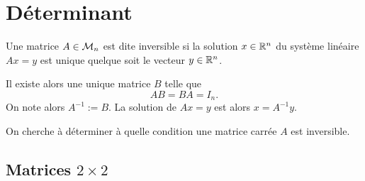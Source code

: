 \section{Déterminant} \label{sec:LinAlg-Det}

\begin{definition} \label{def:matriceInversible}
  Une matrice $A \in \mathcal{M}_n$ est dite inversible si la solution $x \in \mathbb{R}^n$ du système linéaire $A x = y$ est unique quelque soit le vecteur $y \in \mathbb{R}^n$.
\end{definition}

Il existe alors une unique matrice $B$ telle que 
$$
AB = BA = I_n.
$$
On note alors $A^{-1} := B$. La solution de $Ax = y$ est alors $x = A^{-1} y$.

\bigskip
On cherche à déterminer à quelle condition une matrice carrée $A$ est inversible.

\subsection{Matrices $2 \times 2$} 

